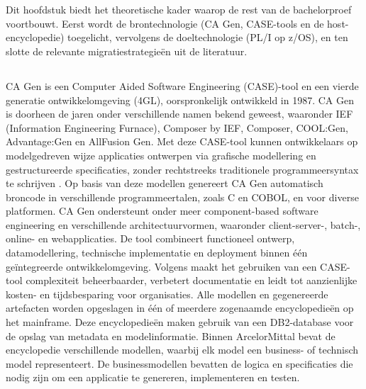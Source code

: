 \chapter{}%
\label{ch:stand-van-zaken}

Dit hoofdstuk biedt het theoretische kader waarop de rest van de bachelorproef voortbouwt. Eerst wordt de brontechnologie (CA Gen, CASE-tools en de host-encyclopedie) toegelicht, vervolgens de doeltechnologie (PL/I op z/OS), en ten slotte de relevante migratiestrategieën uit de literatuur. 

\section{}%
\label{sec:Wat is CA Gen?}
 CA Gen is een Computer Aided Software Engineering (CASE)-tool en een vierde generatie ontwikkelomgeving (4GL), oorspronkelijk ontwikkeld in 1987. CA Gen is doorheen de jaren onder verschillende namen bekend geweest, waaronder IEF (Information Engineering Furnace), Composer by IEF, Composer, COOL:Gen, Advantage:Gen en AllFusion Gen. Met deze CASE-tool kunnen ontwikkelaars op modelgedreven wijze applicaties ontwerpen via grafische modellering en gestructureerde specificaties, zonder rechtstreeks traditionele programmeersyntax te schrijven \autocite{RahulThibodeau2024}. Op basis van deze modellen genereert CA Gen automatisch broncode in verschillende programmeertalen, zoals C en COBOL, en voor diverse platformen. CA Gen ondersteunt onder meer component-based software engineering en verschillende architectuurvormen, waaronder client-server-, batch-, online- en webapplicaties. De tool combineert functioneel ontwerp, datamodellering, technische implementatie en deployment binnen één geïntegreerde ontwikkelomgeving. Volgens \textcite{SHAFIEE2021103432} maakt het gebruiken van een CASE-tool complexiteit beheerbaarder, verbetert documentatie en leidt tot aanzienlijke kosten- en tijdsbesparing voor organisaties.
 Alle modellen en gegenereerde artefacten worden opgeslagen in één of meerdere zogenaamde encyclopedieën op het mainframe. Deze encyclopedieën maken gebruik van een DB2-database voor de opslag van metadata en modelinformatie. Binnen ArcelorMittal bevat de encyclopedie verschillende modellen, waarbij elk model een business- of technisch model representeert. De businessmodellen bevatten de logica en specificaties die nodig zijn om een applicatie te genereren, implementeren en testen. 
 
